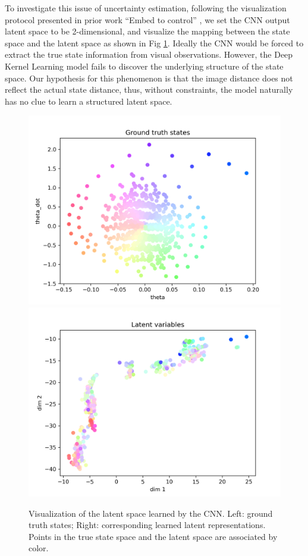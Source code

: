 \documentclass[11pt, reqno, letterpaper, twoside]{amsart}
\begin{document}
To investigate this issue of uncertainty estimation, following the visualization protocol presented in prior work ``Embed to control'' \cite{watter2015embed}, we set the CNN output latent space to be 2-dimensional, and visualize the mapping between the state space and the latent space as shown in Fig \ref{fig:latent}. Ideally the CNN would be forced to extract the true state information from visual observations. However, the Deep Kernel Learning model fails to discover the underlying structure of the state space. Our hypothesis for this phenomenon is that the image distance does not reflect the actual state distance, thus, without constraints, the model naturally has no clue to learn a structured latent space.

\begin{figure}[ht]
	\centering
	\includegraphics[width=0.4\linewidth]{imgs/latentVis_gt_states_0.png}
	\includegraphics[width=0.4\linewidth]{imgs/latentVis_latents_0.png}
	\caption{Visualization of the latent space learned by the CNN. Left: ground truth states; Right: corresponding learned latent representations. Points in the true state space and the latent space are associated by color.}
	\label{fig:latent}
\end{figure}
\end{document}
